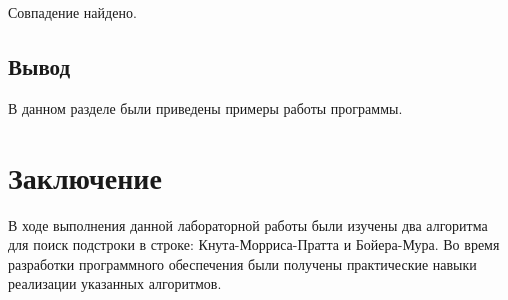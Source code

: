 \documentclass[12pt]{report}
\begin{document}
Совпадение найдено.




\section{Вывод}

В данном разделе были приведены примеры работы программы.



\chapter*{Заключение}
В ходе выполнения данной лабораторной работы были изучены два алгоритма для поиск подстроки в строке: Кнута-Морриса-Пратта и Бойера-Мура. Во время разработки программного обеспечения были получены практические навыки реализации указанных алгоритмов.
\end{document}
